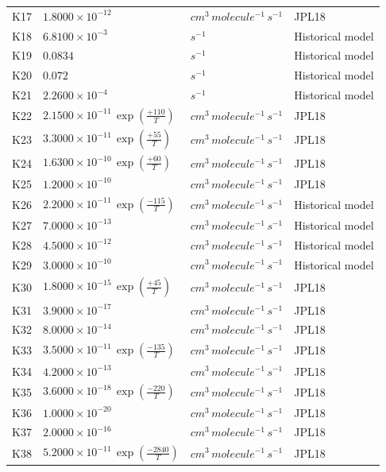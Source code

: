 \begin{longtable}{rp{}p{}l}
K17 & $1.8000\times10^{-12}$ & $cm^3\,molecule^{-1}\,s^{-1}$ & JPL18\\
K18 & $6.8100\times10^{-3}$ & $s^{-1}$ & Historical model\\
K19 & $0.0834$ & $s^{-1}$ & Historical model\\
K20 & $0.072$ & $s^{-1}$ & Historical model\\
K21 & $2.2600\times10^{-4}$ & $s^{-1}$ & Historical model\\
K22 & $2.1500\times10^{-11}\,\exp\left(\frac{+110}{T}\right)$ & $cm^3\,molecule^{-1}\,s^{-1}$ & JPL18\\
K23 & $3.3000\times10^{-11}\,\exp\left(\frac{+55}{T}\right)$ & $cm^3\,molecule^{-1}\,s^{-1}$ & JPL18\\
K24 & $1.6300\times10^{-10}\,\exp\left(\frac{+60}{T}\right)$ & $cm^3\,molecule^{-1}\,s^{-1}$ & JPL18\\
K25 & $1.2000\times10^{-10}$ & $cm^3\,molecule^{-1}\,s^{-1}$ & JPL18\\
K26 & $2.2000\times10^{-11}\,\exp\left(\frac{-115}{T}\right)$ & $cm^3\,molecule^{-1}\,s^{-1}$ & Historical model\\
K27 & $7.0000\times10^{-13}$ & $cm^3\,molecule^{-1}\,s^{-1}$ & Historical model\\
K28 & $4.5000\times10^{-12}$ & $cm^3\,molecule^{-1}\,s^{-1}$ & Historical model\\
K29 & $3.0000\times10^{-10}$ & $cm^3\,molecule^{-1}\,s^{-1}$ & Historical model\\
K30 & $1.8000\times10^{-15}\,\exp\left(\frac{+45}{T}\right)$ & $cm^3\,molecule^{-1}\,s^{-1}$ & JPL18\\
K31 & $3.9000\times10^{-17}$ & $cm^3\,molecule^{-1}\,s^{-1}$ & JPL18\\
K32 & $8.0000\times10^{-14}$ & $cm^3\,molecule^{-1}\,s^{-1}$ & JPL18\\
K33 & $3.5000\times10^{-11}\,\exp\left(\frac{-135}{T}\right)$ & $cm^3\,molecule^{-1}\,s^{-1}$ & JPL18\\
K34 & $4.2000\times10^{-13}$ & $cm^3\,molecule^{-1}\,s^{-1}$ & JPL18\\
K35 & $3.6000\times10^{-18}\,\exp\left(\frac{-220}{T}\right)$ & $cm^3\,molecule^{-1}\,s^{-1}$ & JPL18\\
K36 & $1.0000\times10^{-20}$ & $cm^3\,molecule^{-1}\,s^{-1}$ & JPL18\\
K37 & $2.0000\times10^{-16}$ & $cm^3\,molecule^{-1}\,s^{-1}$ & JPL18\\
K38 & $5.2000\times10^{-11}\,\exp\left(\frac{-2840}{T}\right)$ & $cm^3\,molecule^{-1}\,s^{-1}$ & JPL18\\
\end{longtable}
